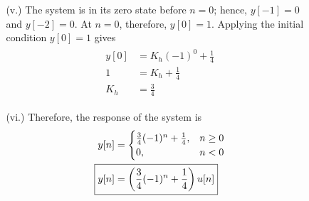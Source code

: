 \documentclass[a4paper, 12pt]{article}
\begin{document}
\begin{itemize}
\begin{itemize}
\begin{itemize}
\begin{equation}
\end{equation}
\item[(v.)]{The system is in its zero state before $n = 0$; hence, $y[-1] = 0$ and $y[-2] = 0$. At $n=0$, therefore, $y[0] = 1$. Applying the initial condition $y[0] = 1$ gives}
\begin{equation}
\begin{gathered}
\begin{alignedat}{1}
y[0] &= K_{h}(-1)^{0} + \frac{1}{4} \\
1 &= K_{h} + \frac{1}{4} \\
K_{h} &= \frac{3}{4}
\end{alignedat}
\end{gathered}
\end{equation}
\item[(vi.)]{Therefore, the response of the system is}
\begin{equation}
\begin{gathered}
\begin{alignedat}{1}
y[n] &= 
\begin{cases}
\frac{3}{4}(-1)^{n} + \frac{1}{4}, & n \geq 0 \\
0, & n < 0
\end{cases} \\
\Aboxed{y[n] & =  \left( \frac{3}{4}(-1)^{n} + \frac{1}{4} \right) u[n]}
\end{alignedat}
\end{gathered}
\end{equation}
\end{itemize}
\end{itemize}
\end{itemize}
\end{document}
